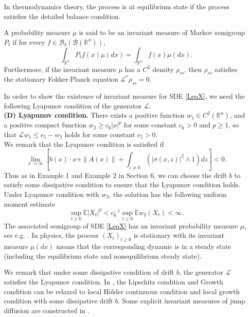 \documentclass[10pt]{article}
\theoremstyle{definition}
\theoremstyle{remark}
\numberwithin{equation}{section}
\begin{document}
In thermodynamics theory, the process is at equilibrium state if the process satisfies the detailed balance condition.

A probability measure $\mu$ is said to be an invariant measure of Markov semigroup $P_t$ if for every $f \in \mathcal{B}_b(\mathscr{B}(\mathbb{R}^n))$,
\begin{equation*}
    \int_{\mathbb{R}^n} P_t f(x) \mu(dx) = \int_{\mathbb{R}^n} f(x) \mu(dx).
\end{equation*}
Furthermore, if the invariant measure $\mu$ has a $C^2$ density $\rho_{ss}$, then $\rho_{ss}$ satisfies the stationary Fokker-Planck equation $\mathcal{L}^{\ast}\rho_{ss} = 0$.

In order to show the existence of invariant measure for SDE \eqref{LeqX}, we need the following Lyapunov condition of the generator $\mathcal{L}$.\\
{\bf (D) Lyapunov condition.} There exists a positive function $w_1 \in C^2(\mathbb{R}^n)$, and a positive compact function $w_2 \geq c_6|x|^p$ for some constant $c_6>0$ and $p \geq 1$, so that $\mathcal{L}w_1 \leq c_5 - w_2$ holds for some constant $c_5>0$.\\
{We remark that the Lyapunov condition is satisfied if
\begin{equation*}
    \lim_{x\to \infty} [b(x) \cdot x + \| A(x) \| + \int_{z \neq 0 } (|\sigma(x,z)|^2 \wedge 1) dz] < 0.
\end{equation*}
Thus as in Example 1 and Example 2 in Section 6, we can choose the drift $b$ to satisfy some dissipative condition to ensure that the Lyapunov condition holds.}
Under Lyapunov condition with $w_2$, the solution has the following uniform moment estimate $$\sup_{t\geq0}\mathbb{E}|X_t|^p < c^{-1}_{6} \sup_{t\geq0}\mathbb{E}w_2(X_t) < \infty.$$ 
The associated semigroup of SDE \eqref{LeqX} has an invariant probability measure $\mu$, see e.g. \cite{H80}. In physics, the process $(X_t)_{t\geq 0}$ is stationary with its invariant measure $\mu(dx)$ means that the corresponding dynamic is in a steady state (including the equilibrium state and nonequilibrium steady state).

We remark that under some dissipative condition of drift $b$, the generator $\mathcal{L}$ satisfies the Lyapunov condition. In \cite{XZ20}, the Lipschitz condition and Growth condition can be relaxed to local H\"{o}lder continuous condition and local growth condition with some dissipative drift $b$. Some explicit invariant measures of jump diffusion are constructed in \cite{ARW00}. 
\end{document}

